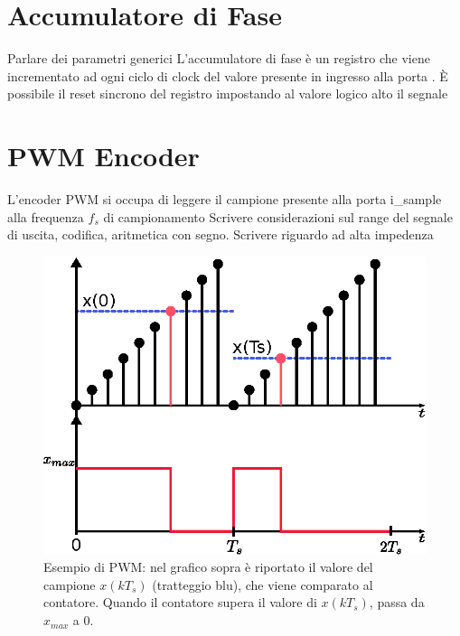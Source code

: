 \section{Accumulatore di Fase}
\label{sec:phaseaccumulator}

\begin{center}
\end{center}
Parlare dei parametri generici
L'accumulatore di fase è un registro che viene incrementato ad ogni ciclo di clock del valore presente in ingresso alla porta .
È possibile il reset sincrono del registro impostando al valore logico alto il segnale 

\section{PWM Encoder}
\label{sec:pwmencoder}

\begin{center}
\end{center}
L'encoder PWM si occupa di leggere il campione presente alla porta i\_sample alla frequenza $f_s$ di campionamento
Scrivere considerazioni sul range del segnale di uscita, codifica, aritmetica con segno.
Scrivere riguardo ad alta impedenza
\begin{figure}
	\centering
	\def\svgwidth{\columnwidth}
	\includegraphics[width=0.7\columnwidth]{TeX_files/pwm_ramp.eps}
	\caption{Esempio di PWM: nel grafico sopra è riportato il valore del campione $x(kT_s)$ (tratteggio blu), che viene comparato al contatore.
	Quando il contatore supera il valore di $x(kT_s)$,  passa da $x_{max}$ a $0$. }
\end{figure}

